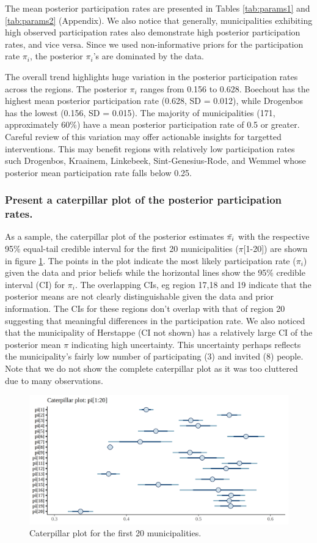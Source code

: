 \documentclass[12pt]{article}
\begin{document}
The mean posterior participation rates are presented in Tables \ref{tab:params1} and \ref{tab:params2} (Appendix). We also notice that generally, municipalities exhibiting high observed participation rates also demonstrate high posterior participation rates, and vice versa. Since we used non-informative priors for the participation rate $\pi_i$, the posterior $\pi_i$'s are dominated by the data. 

The overall trend highlights huge variation in the posterior participation rates across the regions. The posterior $\pi_i$ ranges from 0.156 to 0.628. Boechout has the highest mean posterior participation rate (0.628, SD = 0.012), while Drogenbos has the lowest (0.156, SD = 0.015). The majority of municipalities (171, approximately 60\%) have a mean posterior participation rate of 0.5 or greater. Careful review of this variation may offer actionable insights for targetted interventions. This may benefit regions with relatively low participation rates such Drogenbos, Kraainem, Linkebeek, Sint-Genesius-Rode, and Wemmel whose posterior mean participation rate falls below 0.25.


\subsubsection{Present a caterpillar plot of the posterior participation rates.}

As a sample, the caterpillar plot of the posterior estimates $\Bar{\pi_i}$ with the respective 95\% equal-tail credible interval for the first 20 municipalities ($\pi$[1-20]) are shown in figure \ref{fig:caterpillar1-20}. The points in the plot indicate the most likely participation rate ($\pi_i$) given the data and prior beliefs while the horizontal lines show the 95\% credible interval (CI) for $\pi_i$. The overlapping CIs, eg region 17,18 and 19 indicate that the posterior means are not clearly distinguishable given the data and prior information. The CIs for these regions don't overlap with that of region 20 suggesting that meaningful differences in the participation rate. We also noticed that the municipality of Herstappe (CI not shown) has a relatively large CI of the posterior mean $\pi$ indicating high uncertainty. This uncertainty perhaps reflects the municipality's fairly low number of participating (3) and invited (8) people. Note that we do not show the complete caterpillar plot as it was too cluttered due to many observations. 

\begin{figure}
    \centering
    \includegraphics[width=0.75\linewidth]{pictures/cater1-20.png}
    \caption{Caterpillar plot for the first 20 municipalities.}
    \label{fig:caterpillar1-20}
\end{figure}
\FloatBarrier
\end{document}
